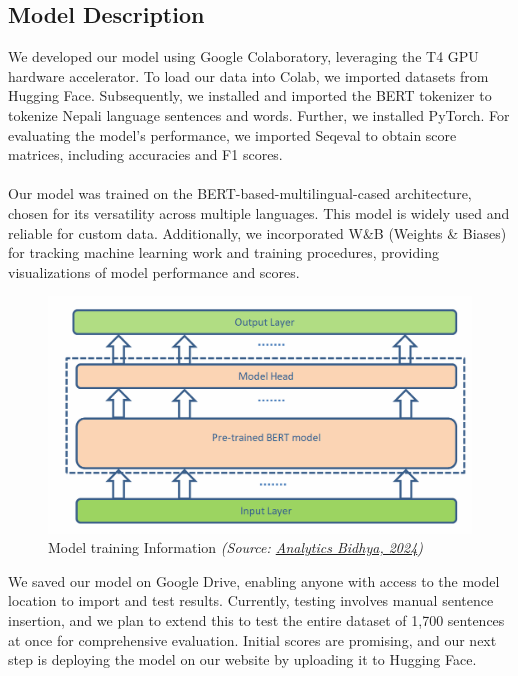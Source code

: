 \subsection{Model Description}
We developed our model using Google Colaboratory, leveraging the T4 GPU hardware accelerator. To load our data into Colab, we imported datasets from Hugging Face. Subsequently, we installed and imported the BERT tokenizer to tokenize Nepali language sentences and words. Further, we installed PyTorch. For evaluating the model's performance, we imported Seqeval to obtain score matrices, including accuracies and F1 scores.\\
\\
Our model was trained on the BERT-based-multilingual-cased architecture, chosen for its versatility across multiple languages. This model is widely used and reliable for custom data. Additionally, we incorporated W\&B (Weights \& Biases) for tracking machine learning work and training procedures, providing visualizations of model performance and scores.\\



\begin{figure}[H]
\centering
\includegraphics [scale=0.6]{img/Graphics/Model training Information.png}
\caption[Model training Information]{ Model training Information \textit{(Source: \href{https://www.analyticsvidhya.com/blog/2022/09/fine-tuning-bert-with-masked-language-modeling/}{Analytics Bidhya, 2024})}}

\end{figure}






  
We saved our model on Google Drive, enabling anyone with access to the model location to import and test results. Currently, testing involves manual sentence insertion, and we plan to extend this to test the entire dataset of 1,700 sentences at once for comprehensive evaluation. Initial scores are promising, and our next step is deploying the model on our website by uploading it to Hugging Face.

